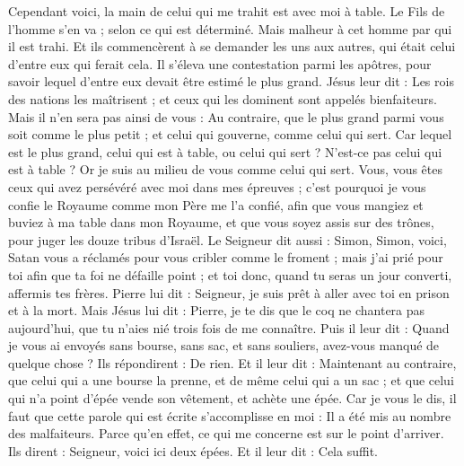 \begin{multicols}{2}
Cependant voici, la main de celui qui me trahit est avec moi à table.
Le Fils de l'homme s'en va ; selon ce qui est déterminé. Mais malheur à cet homme par qui il est trahi.
Et ils commencèrent à se demander les uns aux autres, qui était celui d’entre eux qui ferait cela.
Il s’éleva une contestation parmi les apôtres, pour savoir lequel d'entre eux devait être estimé le plus grand.
Jésus leur dit : Les rois des nations les maîtrisent ; et ceux qui les dominent sont appelés bienfaiteurs.
Mais il n'en sera pas ainsi de vous : Au contraire, que le plus grand parmi vous soit comme le plus petit ; et celui qui gouverne, comme celui qui sert.
Car lequel est le plus grand, celui qui est à table, ou celui qui sert ? N'est-ce pas celui qui est à table ? Or je suis au milieu de vous comme celui qui sert.
Vous, vous êtes ceux qui avez persévéré avec moi dans mes épreuves ;
c’est pourquoi je vous confie le Royaume comme mon Père me l'a confié,
afin que vous mangiez et buviez à ma table dans mon Royaume, et que vous soyez assis sur des trônes, pour juger les douze tribus d'Israël.
Le Seigneur dit aussi : Simon, Simon, voici, Satan vous a réclamés pour vous cribler comme le froment ;
mais j'ai prié pour toi afin que ta foi ne défaille point ; et toi donc, quand tu seras un jour converti, affermis tes frères.
Pierre lui dit : Seigneur, je suis prêt à aller avec toi en prison et à la mort.
Mais Jésus lui dit : Pierre, je te dis que le coq ne chantera pas aujourd'hui, que tu n’aies nié trois fois de me connaître.
Puis il leur dit : Quand je vous ai envoyés sans bourse, sans sac, et sans souliers, avez-vous manqué de quelque chose ? Ils répondirent : De rien.
Et il leur dit : Maintenant au contraire, que celui qui a une bourse la prenne, et de même celui qui a un sac ; et que celui qui n'a point d'épée vende son vêtement, et achète une épée.
Car je vous le dis, il faut que cette parole qui est écrite s’accomplisse en moi : Il a été mis au nombre des malfaiteurs. Parce qu’en effet, ce qui me concerne est sur le point d’arriver.
Ils dirent : Seigneur, voici ici deux épées. Et il leur dit : Cela suffit.

\end{multicols}
